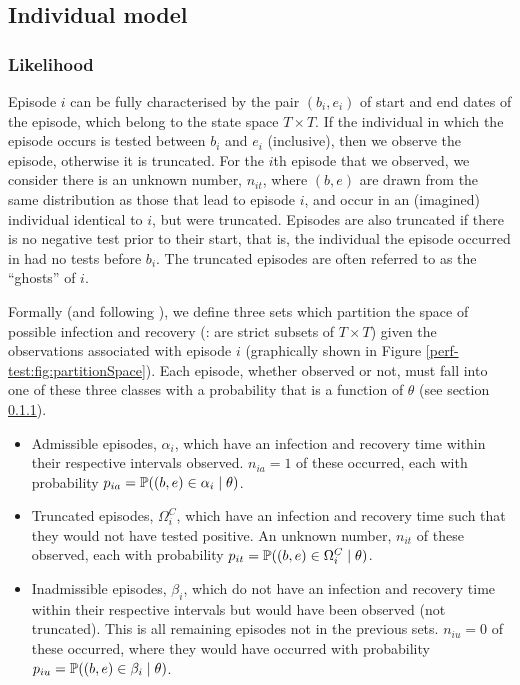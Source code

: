\documentclass[main.tex]{subfiles}
\begin{document}
\subsection{Individual model}\label{perf-test:sec:individual-model}

\subsubsection{Likelihood}\label{perf-test:sec:likelihood}

Episode $i$ can be fully characterised by the pair $(b_i, e_i)$ of
start and end dates of the episode, which belong to the state space
$T \times T$. If the individual in which the episode occurs is tested
between $b_i$ and $e_i$ (inclusive), then we observe the episode,
otherwise it is truncated. For the $i$th episode that we observed, we
consider there is an unknown number, $n_{it}$, where $(b, e)$ are
drawn from the same distribution as those that lead to episode $i$,
and occur in an (imagined) individual identical to $i$, but were
truncated. Episodes are also truncated if there is no negative test
prior to their start, that is, the individual the episode occurred in
had no tests before $b_i$. The truncated episodes are often referred
to as the ``ghosts'' of $i$.

Formally (and following \textcite{heiseyModelling}), we
define three sets which partition the space of possible infection and
recovery (\ie: are strict subsets of $T \times T$) given the
observations associated with episode $i$ (graphically shown in Figure
\ref{perf-test:fig:partitionSpace}). Each episode, whether observed or not, must
fall into one of these three classes with a probability that is a
function of $\theta$ (see section \ref{perf-test:sec:likelihood}).

\begin{itemize}
\item
  Admissible episodes, $\alpha_i$, which have an infection and
  recovery time within their respective intervals observed.
  $n_{ia} =1$ of these occurred, each with probability
  $p_{ia} = \operatorname{\mathbb{P}}((b, e) \in \alpha_i \mid \theta)$.
\item
  Truncated episodes, $\Omega_i^C$, which have an infection and
  recovery time such that they would not have tested positive. An
  unknown number, $n_{it}$ of these observed, each with probability
  $p_{it} = \operatorname{\mathbb{P}}((b, e) \in \Omega^C_i \mid \theta)$.
\item
  Inadmissible episodes, $\beta_i$, which do not have an infection and
  recovery time within their respective intervals but would have been
  observed (not truncated). This is all remaining episodes not in the
  previous sets. $n_{iu} = 0$ of these occurred, where they would have
  occurred with probability
  $p_{iu} = \operatorname{\mathbb{P}}((b, e) \in \beta_i \mid \theta)$.
\end{itemize}
\end{document}

